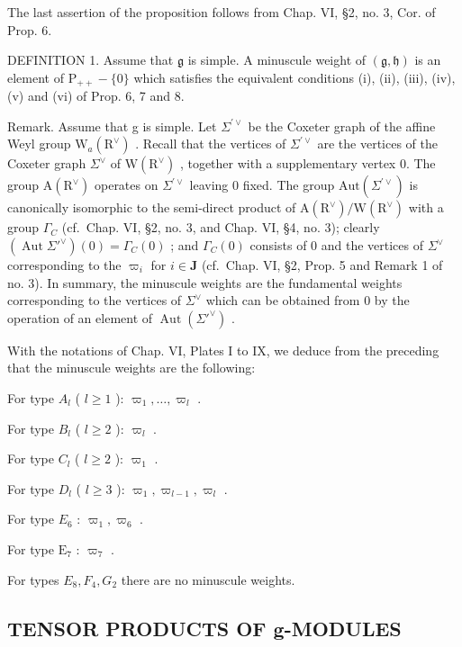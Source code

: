 The last assertion of the proposition follows from Chap. VI, §2, no. 3, Cor. of Prop. 6.

DEFINITION 1. Assume that \(\mathfrak{g}\) is simple. A minuscule weight of \((\mathfrak{g},\mathfrak{h})\) is an element of \(\mathrm{P}_{++} - \{0\}\) which satisfies the equivalent conditions (i), (ii), (iii), (iv), (v) and (vi) of Prop. 6, 7 and 8.

Remark. Assume that g is simple. Let \(\Sigma^{\prime\vee}\) be the Coxeter graph of the affine Weyl group \(\mathrm{W}_{a}(\mathrm{R}^{\vee})\) . Recall that the vertices of \(\Sigma^{\prime\vee}\) are the vertices of the Coxeter graph \(\Sigma^{\vee}\) of \(\mathrm{W}(\mathrm{R}^{\vee})\) , together with a supplementary vertex 0. The group \(\mathrm{A}(\mathrm{R}^{\vee})\) operates on \(\Sigma^{\prime\vee}\) leaving 0 fixed. The group \(\mathrm{Aut}(\Sigma^{\prime\vee})\) is canonically isomorphic to the semi-direct product of \(\mathrm{A}(\mathrm{R}^{\vee})/\mathrm{W}(\mathrm{R}^{\vee})\) with a group \(\Gamma_{C}\) (cf.~Chap. VI, §2, no. 3, and Chap. VI, §4, no. 3); clearly \((\operatorname{Aut} \Sigma'^{\vee})(0) = \Gamma_C(0)\) ; and \(\Gamma_C(0)\) consists of 0 and the vertices of \(\Sigma^{\vee}\) corresponding to the \(\varpi_i\) for \(i \in \mathbf{J}\) (cf.~Chap. VI, §2, Prop. 5 and Remark 1 of no. 3). In summary, the minuscule weights are the fundamental weights corresponding to the vertices of \(\Sigma^{\vee}\) which can be obtained from 0 by the operation of an element of \(\operatorname{Aut}(\Sigma'^{\vee})\) .

With the notations of Chap. VI, Plates I to IX, we deduce from the preceding that the minuscule weights are the following:

For type \(A_{l}\) ( \(l \geq 1\) ): \(\varpi_{1}, \ldots, \varpi_{l}\) .

For type \(B_{l}\) ( \(l \geq 2\) ): \(\varpi_{l}\) .

For type \(C_{l}\) ( \(l \geq 2\) ): \(\varpi_{1}\) .

For type \(D_{l}\) ( \(l \geq 3\) ): \(\varpi_{1}, \varpi_{l-1}, \varpi_{l}\) .

For type \(E_{6}\) : \(\varpi_{1}, \varpi_{6}\) .

For type \(\mathrm{E}_7\) : \(\varpi_7\) .

For types \(E_{8}, F_{4}, G_{2}\) there are no minuscule weights.

\subsection{TENSOR PRODUCTS OF g-MODULES}


